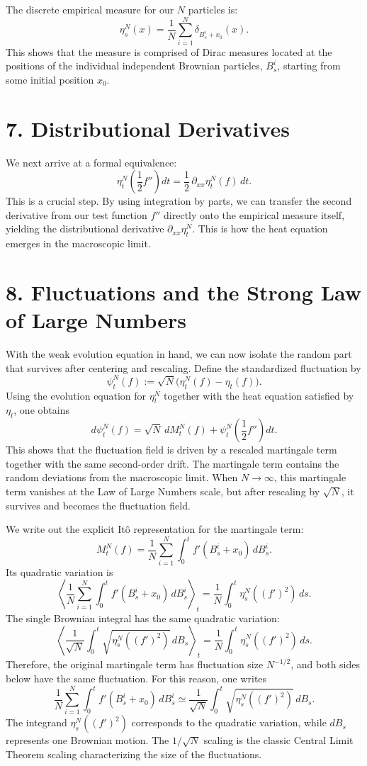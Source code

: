 \documentclass[11pt]{article}
\theoremstyle{definition}
\theoremstyle{remark}
\begin{document}
The discrete empirical measure for our $N$ particles is:
\[
\eta_s^N(x)=\frac{1}{N}\sum_{i=1}^N \delta_{B_s^i+x_0}(x).
\]
This shows that the measure is comprised of Dirac measures located at the positions of the individual independent Brownian particles, $B_s^i$, starting from some initial position $x_0$.

\section*{7. Distributional Derivatives}
We next arrive at a formal equivalence:
\[
\eta_t^N\!\left(\frac{1}{2}f''\right)dt=\frac{1}{2}\,\partial_{xx}\eta_t^N(f)\,dt.
\]
This is a crucial step. By using integration by parts, we can transfer the second derivative from our test function $f''$ directly onto the empirical measure itself, yielding the distributional derivative $\partial_{xx}\eta_t^N$. This is how the heat equation emerges in the macroscopic limit.

\section*{8. Fluctuations and the Strong Law of Large Numbers}
With the weak evolution equation in hand, we can now isolate the random part that survives after centering and rescaling. Define the standardized fluctuation by
\[
\psi_t^N(f):=\sqrt{N}\bigl(\eta_t^N(f)-\eta_t(f)\bigr).
\]
Using the evolution equation for $\eta_t^N$ together with the heat equation satisfied by $\eta_t$, one obtains
\[
d\psi_t^N(f)=\sqrt{N}\,dM_t^N(f)+\psi_t^N\!\left(\frac{1}{2}f''\right)dt.
\]
This shows that the fluctuation field is driven by a rescaled martingale term together with the same second-order drift. The martingale term contains the random deviations from the macroscopic limit. When $N\to\infty$, this martingale term vanishes at the Law of Large Numbers scale, but after rescaling by $\sqrt{N}$, it survives and becomes the fluctuation field.

We write out the explicit It\^o representation for the martingale term:
\[
M_t^N(f)=\frac{1}{N}\sum_{i=1}^N \int_0^t f'(B_s^i+x_0)\,dB_s^i.
\]
Its quadratic variation is
\[
\left\langle
\frac{1}{N}\sum_{i=1}^N \int_0^t f'(B_s^i+x_0)\,dB_s^i
\right\rangle_t
=
\frac{1}{N}\int_0^t \eta_s^N((f')^2)\,ds.
\]
The single Brownian integral has the same quadratic variation:
\[
\left\langle
\frac{1}{\sqrt{N}}\int_0^t \sqrt{\eta_s^N((f')^2)}\,dB_s
\right\rangle_t
=
\frac{1}{N}\int_0^t \eta_s^N((f')^2)\,ds.
\]
Therefore, the original martingale term has fluctuation size $N^{-1/2}$, and both sides below have the same fluctuation. For this reason, one writes
\[
\frac{1}{N}\sum_{i=1}^N \int_0^t f'(B_s^i+x_0)\,dB_s^i \simeq \frac{1}{\sqrt{N}}\int_0^t \sqrt{\eta_s^N((f')^2)}\,dB_s.
\]
The integrand $\eta_s^N((f')^2)$ corresponds to the quadratic variation, while $dB_s$ represents one Brownian motion. The $1/\sqrt{N}$ scaling is the classic Central Limit Theorem scaling characterizing the size of the fluctuations.
\end{document}
